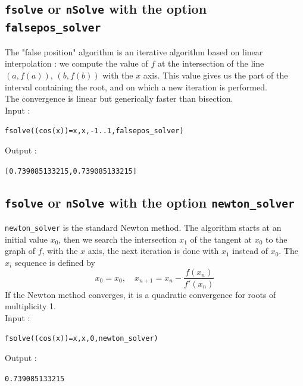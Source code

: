 \documentclass[a4paper,11pt]{book}
\begin{document}
\subsection{{\tt fsolve} or {\tt nSolve} with the option {\tt falsepos\_solver}}
The "false position" algorithm is an iterative algorithm based on linear 
interpolation : we compute the value of $f$ at the intersection of the line  
$(a,f(a))$, $(b,f(b))$ with the $x$ axis. This value gives us the part of the 
interval containing the root, and on which a new iteration is performed.\\
The convergence is linear but generically faster than bisection.\\
Input :
\begin{center}{\tt fsolve((cos(x))=x,x,-1..1,falsepos\_solver)}\end{center}
Output :
\begin{center}{\tt [0.739085133215,0.739085133215]}\end{center}

\subsection{{\tt fsolve} or {\tt nSolve} with the option {\tt newton\_solver}}
{\tt newton\_solver} is the standard Newton method.
The algorithm starts at an initial value  $x_0$, then we search the 
intersection $x_1$ of the tangent at $x_0$ to the graph of $f$, with the $x$ 
axis, the next iteration is done with $x_1$ instead of $x_0$.
The  $x_i$ sequence is defined by
\[ x_0=x_0, \quad x_{n+1}=x_n-\frac{f(x_n)}{f'(x_n)} \]
If the Newton method converges, it is a quadratic convergence for 
roots of multiplicity 1.\\
Input :
\begin{center}{\tt fsolve((cos(x))=x,x,0,newton\_solver)}\end{center}
Output :
\begin{center}{\tt 0.739085133215}\end{center}
\end{document}
